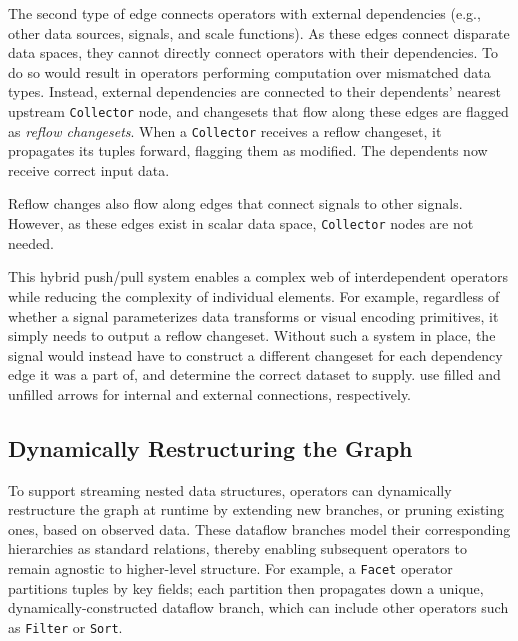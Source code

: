 The second type of edge connects operators with external dependencies (e.g.,
other data sources, signals, and scale functions). As these edges connect
disparate data spaces, they cannot directly connect operators with their
dependencies. To do so would result in operators performing computation over
mismatched data types. Instead, external dependencies are connected to their
dependents' nearest upstream \texttt{Collector} node, and changesets that flow
along these edges are flagged as \emph{reflow changesets}. When a
\texttt{Collector} receives a reflow changeset, it propagates its tuples
forward, flagging them as modified. The dependents now receive correct input
data.

Reflow changes also flow along edges that connect signals to other signals.
However, as these edges exist in scalar data space, \texttt{Collector} nodes are
not needed.

This hybrid push/pull system enables a complex web of interdependent operators
while reducing the complexity of individual elements. For example, regardless of
whether a signal parameterizes data transforms or visual encoding primitives, it
simply needs to output a reflow changeset. Without such a system in place, the
signal would instead have to construct a different changeset for each dependency
edge it was a part of, and determine the correct dataset to supply.
 use filled and unfilled
arrows for internal and external connections, respectively.

\vspace{-10pt}

\subsection{Dynamically Restructuring the Graph}

\vspace{-7pt}

To support streaming nested data structures, operators can dynamically
restructure the graph at runtime by extending new branches, or pruning
existing ones, based on observed data. These dataflow branches model their
corresponding hierarchies as standard relations, thereby enabling subsequent
operators to remain agnostic to higher-level structure. For example, a
\texttt{Facet} operator partitions tuples by key fields; each partition then
propagates down a unique, dynamically-constructed dataflow branch, which can
include other operators such as \texttt{Filter} or \texttt{Sort}.

